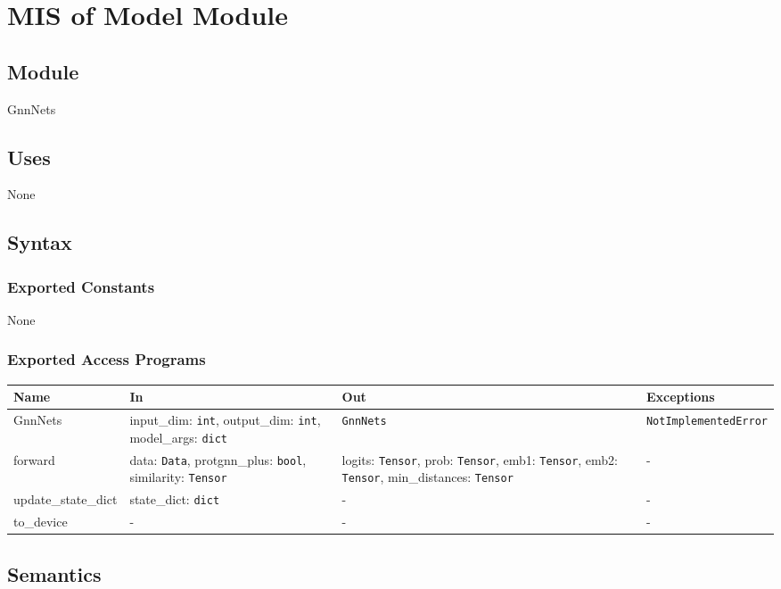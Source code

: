 \documentclass[12pt, titlepage]{article}
\begin{document}
\section{MIS of Model Module} \label{Model}

\subsection{Module}
GnnNets

\subsection{Uses}
None

\subsection{Syntax}

\subsubsection{Exported Constants}
None

\subsubsection{Exported Access Programs}

\begin{center}
\begin{tabular}{p{3cm} p{4.5cm} p{4.5cm} p{3cm}}
\hline
\textbf{Name} & \textbf{In} & \textbf{Out} & \textbf{Exceptions} \\
\hline
GnnNets & input\_dim: \texttt{int}, output\_dim: \texttt{int}, model\_args: \texttt{dict} & \texttt{GnnNets} & \texttt{NotImplementedError} \\
forward & data: \texttt{Data}, protgnn\_plus: \texttt{bool}, similarity: \texttt{Tensor} & logits: \texttt{Tensor}, prob: \texttt{Tensor}, emb1: \texttt{Tensor}, emb2: \texttt{Tensor}, min\_distances: \texttt{Tensor} & - \\
update\_state\_dict & state\_dict: \texttt{dict} & - & - \\
to\_device & - & - & - \\

\hline
\end{tabular}
\end{center}

\subsection{Semantics}
\end{document}
